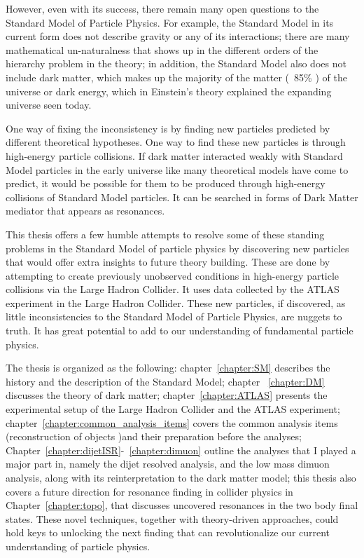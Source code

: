 However, even with its success, there remain many open questions to the Standard Model of Particle Physics. %
For example, the Standard Model in its current form does not describe gravity or any of its interactions; there are many mathematical un-naturalness that shows up in the different orders of the hierarchy problem in the theory; in addition, the
Standard Model also does not include dark matter, which makes up the majority of the matter (~85\% ) of the universe or dark energy, which in 
Einstein's theory explained the expanding universe seen today.  

One way of fixing the inconsistency is by finding new particles predicted by different theoretical hypotheses. One way to find these new particles  is through high-energy particle collisions. If dark matter interacted weakly with Standard Model particles in the early universe like many theoretical models have come to predict, it would be possible for them to be produced through high-energy collisions of Standard Model particles. It can be searched in forms of Dark Matter mediator that appears as resonances.

This thesis offers a few humble attempts to resolve some of these standing problems in the Standard Model of particle physics by discovering new particles that would offer extra insights to future theory building. These are done by attempting to create previously unobserved conditions in high-energy particle collisions via the Large Hadron Collider. It uses data collected by the ATLAS experiment in the Large Hadron Collider. These new particles, if discovered, as little inconsistencies to the Standard Model of Particle
Physics, are nuggets to truth. It has great potential to add to our understanding of fundamental particle physics.

The thesis is organized as the following: chapter~\ref{chapter:SM} describes the history and the description of the Standard Model; chapter ~\ref{chapter:DM} discusses the theory of dark matter; chapter~\ref{chapter:ATLAS} presents the experimental setup of the Large Hadron Collider and the ATLAS experiment;
chapter~\ref{chapter:common_analysis_items} covers the common analysis items (reconstruction
of objects )and their preparation before the analyses; Chapter~\ref{chapter:dijetISR}-~\ref{chapter:dimuon} outline the analyses that I played a major part in, namely the dijet resolved analysis, and the low mass dimuon analysis, along with its reinterpretation to the dark matter model; this thesis also covers a future direction for resonance finding in collider physics in Chapter~\ref{chapter:topo}, that discusses uncovered resonances in the two body final states. 
These novel techniques, together with theory-driven approaches, could hold keys to unlocking the next finding that can revolutionalize our current understanding of particle physics. 

